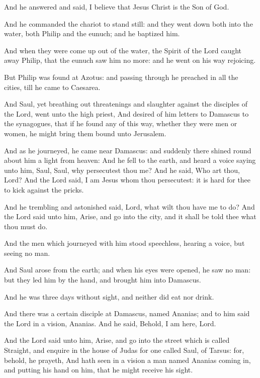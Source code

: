 And he answered and said, I believe that Jesus Christ is the Son of God.

\Verse And he commanded the chariot to stand still: and they went down both into the water, both Philip and the eunuch; and he baptized him.

\Verse And when they were come up out of the water, the Spirit of the Lord caught away Philip, that the eunuch saw him no more: and he went on his way rejoicing.

\Verse But Philip was found at Azotus: and passing through he preached in all the cities, till he came to Caesarea.


\Chapter
\Verse And Saul, yet breathing out threatenings and slaughter against the disciples of the Lord, went unto the high priest, \Verse And desired of him letters to Damascus to the synagogues, that if he found any of this way, whether they were men or women, he might bring them bound unto Jerusalem.

\Verse And as he journeyed, he came near Damascus: and suddenly there shined round about him a light from heaven: \Verse And he fell to the earth, and heard a voice saying unto him, Saul, Saul, why persecutest thou me?  \Verse And he said, Who art thou, Lord? And the Lord said, I am Jesus whom thou persecutest: it is hard for thee to kick against the pricks.

\Verse And he trembling and astonished said, Lord, what wilt thou have me to do? And the Lord said unto him, Arise, and go into the city, and it shall be told thee what thou must do.

\Verse And the men which journeyed with him stood speechless, hearing a voice, but seeing no man.

\Verse And Saul arose from the earth; and when his eyes were opened, he saw no man: but they led him by the hand, and brought him into Damascus.

\Verse And he was three days without sight, and neither did eat nor drink.

\Verse And there was a certain disciple at Damascus, named Ananias; and to him said the Lord in a vision, Ananias. And he said, Behold, I am here, Lord.

\Verse And the Lord said unto him, Arise, and go into the street which is called Straight, and enquire in the house of Judas for one called Saul, of Tarsus: for, behold, he prayeth, \Verse And hath seen in a vision a man named Ananias coming in, and putting his hand on him, that he might receive his sight.


